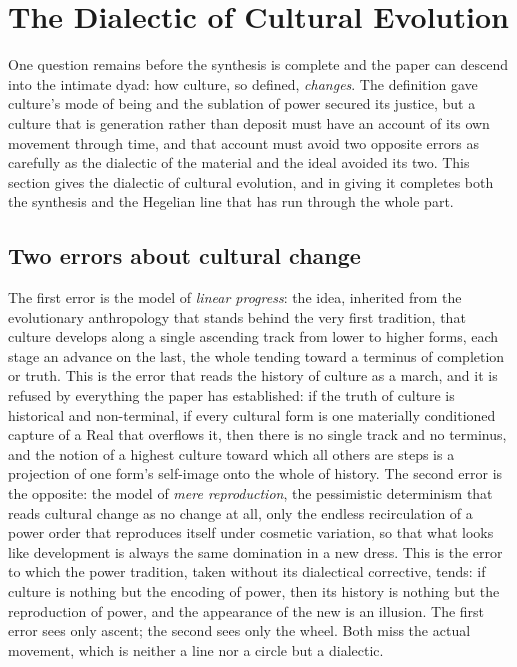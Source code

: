 \section{The Dialectic of Cultural Evolution}
\label{p24:sec:evolution}

\noindent
One question remains before the synthesis is complete and the paper can descend into the intimate dyad: how culture, so defined, \emph{changes}. The definition gave culture's mode of being and the sublation of power secured its justice, but a culture that is generation rather than deposit must have an account of its own movement through time, and that account must avoid two opposite errors as carefully as the dialectic of the material and the ideal avoided its two. This section gives the dialectic of cultural evolution, and in giving it completes both the synthesis and the Hegelian line that has run through the whole part.

\subsection*{Two errors about cultural change}

The first error is the model of \emph{linear progress}: the idea, inherited from the evolutionary anthropology that stands behind the very first tradition, that culture develops along a single ascending track from lower to higher forms, each stage an advance on the last, the whole tending toward a terminus of completion or truth. This is the error that reads the history of culture as a march, and it is refused by everything the paper has established: if the truth of culture is historical and non-terminal, if every cultural form is one materially conditioned capture of a Real that overflows it, then there is no single track and no terminus, and the notion of a highest culture toward which all others are steps is a projection of one form's self-image onto the whole of history. The second error is the opposite: the model of \emph{mere reproduction}, the pessimistic determinism that reads cultural change as no change at all, only the endless recirculation of a power order that reproduces itself under cosmetic variation, so that what looks like development is always the same domination in a new dress. This is the error to which the power tradition, taken without its dialectical corrective, tends: if culture is nothing but the encoding of power, then its history is nothing but the reproduction of power, and the appearance of the new is an illusion. The first error sees only ascent; the second sees only the wheel. Both miss the actual movement, which is neither a line nor a circle but a dialectic.


